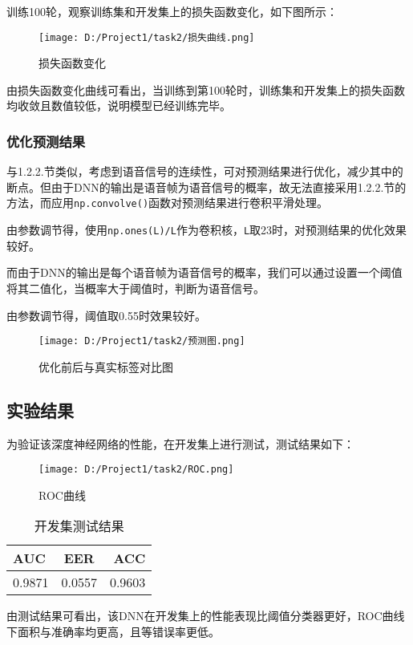 \documentclass[a4paper]{article}
\begin{document}
训练100轮，观察训练集和开发集上的损失函数变化，如下图所示：

\begin{figure}[H]
    \centering
  \texttt{[image: D:/Project1/task2/损失曲线.png]}
  \caption{损失函数变化}
\end{figure}

由损失函数变化曲线可看出，当训练到第100轮时，训练集和开发集上的损失函数均收敛且数值较低，说明模型已经训练完毕。

\subsubsection{优化预测结果}

与1.2.2.节类似，考虑到语音信号的连续性，可对预测结果进行优化，减少其中的断点。但由于DNN的输出是语音帧为语音信号的概率，故无法直接采用1.2.2.节的方法，而应用\verb|np.convolve()|函数对预测结果进行卷积平滑处理。

由参数调节得，使用\verb|np.ones(L)/L|作为卷积核，\verb|L|取23时，对预测结果的优化效果较好。

而由于DNN的输出是每个语音帧为语音信号的概率，我们可以通过设置一个阈值将其二值化，当概率大于阈值时，判断为语音信号。

由参数调节得，阈值取0.55时效果较好。

\begin{figure}[H]
    \centering
  \texttt{[image: D:/Project1/task2/预测图.png]}
  \caption{优化前后与真实标签对比图}
\end{figure}

\subsection{实验结果}


为验证该深度神经网络的性能，在开发集上进行测试，测试结果如下：

\begin{figure}[H]
    \centering
  \texttt{[image: D:/Project1/task2/ROC.png]}
  \caption{ROC曲线}
\end{figure}

\begin{table}[H]
    \caption{开发集测试结果}
    \centering
    \begin{tabular}{ l c r }
        \toprule
        \textbf{AUC} & \textbf{EER} & \textbf{ACC} \\
        \midrule
        0.9871 & 0.0557 & 0.9603 \\
        \bottomrule
    \end{tabular}
\end{table}

由测试结果可看出，该DNN在开发集上的性能表现比阈值分类器更好，ROC曲线下面积与准确率均更高，且等错误率更低。
\end{document}
